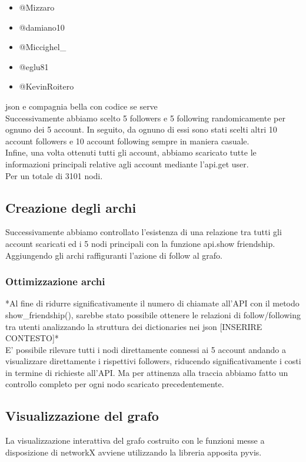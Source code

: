 \documentclass[a4paper,11pt]{report}
\begin{document}
\begin{itemize}
\item @Mizzaro
\item @damiano10
\item @Miccighel\_
\item @eglu81
\item @KevinRoitero
 \end{itemize}
json e compagnia bella con codice se serve \\
\setlength{\parindent}{0pt} 
Successivamente abbiamo scelto 5 followers e 5 following randomicamente per ognuno dei 5 account. In seguito, da ognuno di essi sono stati scelti altri 10 account followers e 10 account following sempre in maniera casuale.\\

Infine, una volta ottenuti tutti gli account, abbiamo scaricato tutte le informazioni principali relative agli account mediante l'api.get user.\\
Per un totale di 3101 nodi.
\subsection{Creazione degli archi}
Successivamente abbiamo controllato l'esistenza di una relazione tra tutti gli account scaricati ed i 5 nodi principali con la funzione api.show friendship. Aggiungendo gli archi raffiguranti l'azione di follow al grafo.
\subsubsection{Ottimizzazione archi}
*Al fine di ridurre significativamente il numero di chiamate all'API con il metodo show_friendship(), sarebbe stato possibile ottenere le relazioni di follow/following tra utenti analizzando la struttura dei dictionaries nei json [INSERIRE CONTESTO]*\\
E' possibile rilevare tutti i nodi direttamente connessi ai 5 account andando a visualizzare direttamente i rispettivi followers, riducendo significativamente i costi in termine di richieste all'API. Ma per attinenza alla traccia abbiamo fatto un controllo completo per ogni nodo scaricato precedentemente.

\subsection{Visualizzazione del grafo}
La visualizzazione interattiva del grafo costruito con le funzioni messe a disposizione di networkX avviene utilizzando la libreria apposita pyvis.
\end{document}
